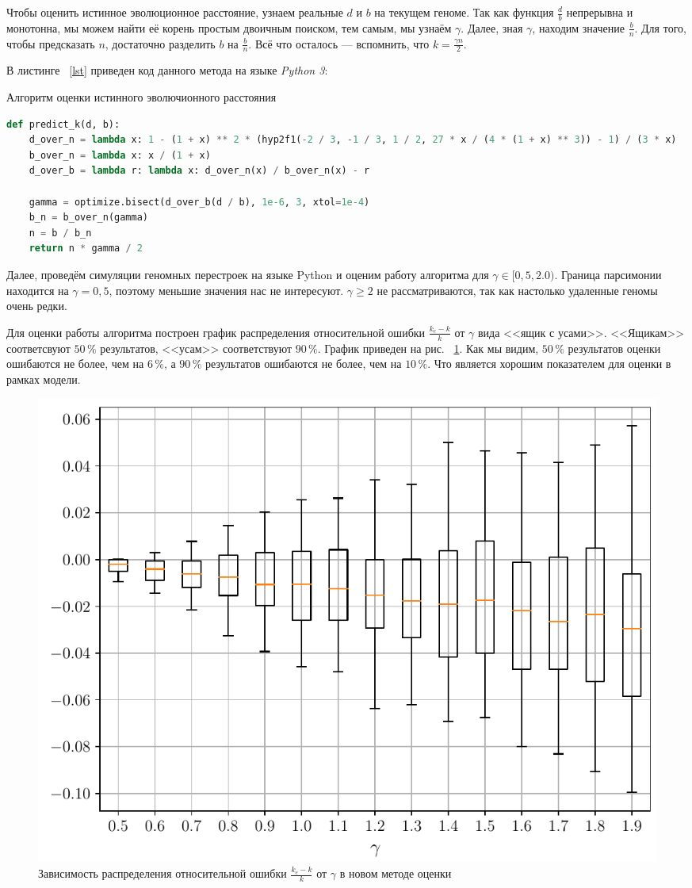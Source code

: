 Чтобы оценить истинное эволюционное расстояние, узнаем реальные $d$ и $b$ на текущем геноме.
Так как функция $\frac d b$ непрерывна и монотонна, мы можем найти её корень простым двоичным поиском, тем самым, мы узнаём $\gamma$.
Далее, зная $\gamma$, находим значение $\frac b n$.
Для того, чтобы предсказать $n$, достаточно разделить $b$ на $\frac b n$.
Всё что осталось --- вспомнить, что $k = \frac {\gamma n} 2$.

В листинге ~\ref{lst} приведен код данного метода на языке \textit{Python 3}:
\begin{algorithm}[!h]
\caption{Алгоритм оценки истинного эволючионного расстояния}
\label{lst}
\begin{lstlisting}[language=Python]
def predict_k(d, b):
    d_over_n = lambda x: 1 - (1 + x) ** 2 * (hyp2f1(-2 / 3, -1 / 3, 1 / 2, 27 * x / (4 * (1 + x) ** 3)) - 1) / (3 * x)
    b_over_n = lambda x: x / (1 + x)
    d_over_b = lambda r: lambda x: d_over_n(x) / b_over_n(x) - r

    gamma = optimize.bisect(d_over_b(d / b), 1e-6, 3, xtol=1e-4)
    b_n = b_over_n(gamma)
    n = b / b_n
    return n * gamma / 2
\end{lstlisting}
\end{algorithm}

Далее, проведём симуляции геномных перестроек на языке \textrm{Python} и оценим работу алгоритма для $\gamma \in [0,5, 2.0)$. Граница парсимонии находится на $\gamma = 0,5$, поэтому меньшие значения нас не интересуют. $\gamma \geq 2$ не рассматриваются, так как настолько удаленные геномы очень редки.

Для оценки работы алгоритма построен график распределения относительной ошибки $\frac {k_e - k} k$ от $\gamma$ вида <<ящик с усами>>. <<Ящикам>> соответсвуют $50 \, \%$ результатов, <<усам>> соответствуют $90 \, \%$. График приведен на рис. ~\ref{dir_est_05_20}. Как мы видим, $50 \, \%$ результатов оценки ошибаются не более, чем на $6 \, \%$, а $90 \, \%$ результатов ошибаются не более, чем на $10 \, \%$. Что является хорошим показателем для оценки в рамках модели.
\begin{figure}[h!]
    \includegraphics[width=0.8\linewidth]{img/dir_est_05_20.pdf}
    \caption{Зависимость распределения относительной ошибки $\frac {k_e - k} k$ от $\gamma$ в новом методе оценки}
    \label{dir_est_05_20}
\end{figure}

